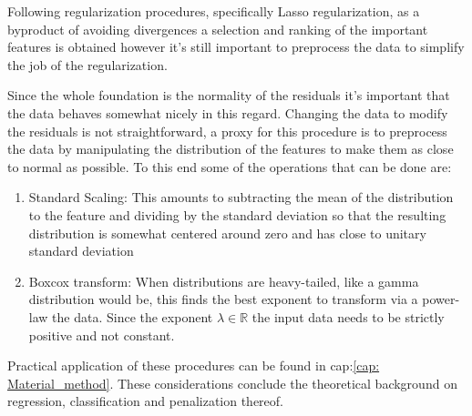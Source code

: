 Following regularization procedures, specifically Lasso regularization, as a byproduct of avoiding divergences a selection and ranking of the important features is obtained however it's still important to preprocess the data to simplify the job of the regularization.

Since the whole foundation is the normality of the residuals it's important that the data behaves somewhat nicely in this regard. Changing the data to modify the residuals is not straightforward, a proxy for this procedure is to preprocess the data by manipulating the distribution of the features to make them as close to normal as possible.
To this end some of the operations that can be done are:

\begin{enumerate}
\item Standard Scaling: This amounts to subtracting the mean of the distribution to the feature and dividing by the standard deviation so that the resulting distribution is somewhat centered around zero and has close to unitary standard deviation
\item  Boxcox transform: When distributions are heavy-tailed, like a gamma distribution would be, this finds the best exponent to transform via a power-law the data. Since the exponent $\lambda \in$$\mathbb{R}$ the input data needs to be strictly positive and not constant.
\end{enumerate}

Practical application of these procedures can be found in  cap:\ref{cap: Material_method}. These considerations conclude the theoretical background on regression, classification and penalization thereof.

